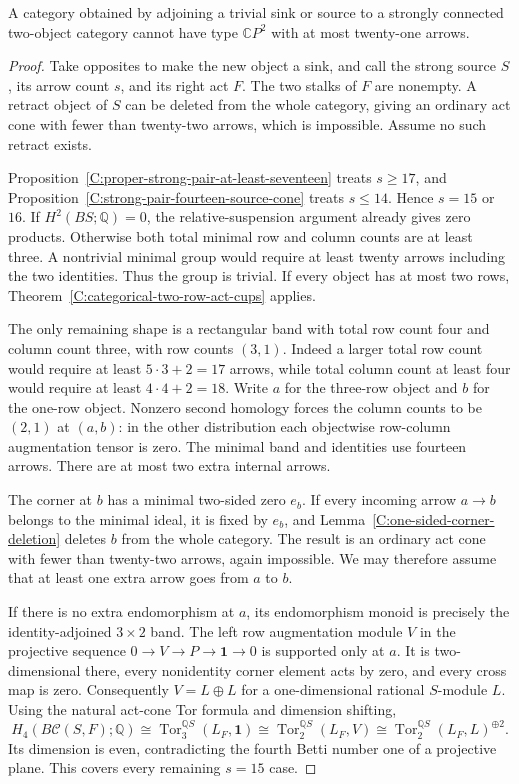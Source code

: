 \begin{theorem}\label{C:strong-pair-trivial-endpoint21}
A category obtained by adjoining a trivial sink or source to a
strongly connected two-object category cannot have type
$\mathbb CP^2$ with at most twenty-one arrows.
\end{theorem}
\begin{proof}
Take opposites to make the new object a sink, and call the strong
source $S$, its arrow count $s$, and its right act $F$. The two
stalks of $F$ are nonempty. A retract object of $S$ can be deleted
from the whole category, giving an ordinary act cone with fewer
than twenty-two arrows, which is impossible. Assume no such
retract exists.

Proposition~\ref{C:proper-strong-pair-at-least-seventeen} treats
$s\geq17$, and Proposition~\ref{C:strong-pair-fourteen-source-cone}
treats $s\leq14$. Hence $s=15$ or $16$.
If $H^2(BS;\mathbb Q)=0$, the relative-suspension argument
already gives zero products. Otherwise both total minimal row
and column counts are at least three. A nontrivial minimal group
would require at least twenty arrows including the two identities.
Thus the group is trivial. If every object has at most two rows,
Theorem~\ref{C:categorical-two-row-act-cups} applies.

The only remaining shape is a rectangular band with total row
count four and column count three, with row counts $(3,1)$.
Indeed a larger total row count would require at least
$5\cdot3+2=17$ arrows, while total column count at least four
would require at least $4\cdot4+2=18$. Write $a$ for the
three-row object and $b$ for the one-row object. Nonzero second
homology forces the column counts to be $(2,1)$ at $(a,b)$:
in the other distribution each objectwise row-column augmentation
tensor is zero. The minimal band and identities use fourteen
arrows. There are at most two extra internal arrows.

The corner at $b$ has a minimal two-sided zero $e_b$.
If every incoming arrow $a\to b$ belongs to the minimal ideal,
it is fixed by $e_b$, and
Lemma~\ref{C:one-sided-corner-deletion} deletes $b$ from the whole
category. The result is an ordinary act cone with fewer than
twenty-two arrows, again impossible.
We may therefore assume that at least one extra arrow goes
from $a$ to $b$.

If there is no extra endomorphism at $a$, its endomorphism monoid
is precisely the identity-adjoined $3\times2$ band. The left row
augmentation module $V$ in the projective sequence
$0\to V\to P\to\mathbf1\to0$ is supported only at $a$.
It is two-dimensional there, every nonidentity corner element
acts by zero, and every cross map is zero. Consequently
$V=L\oplus L$ for a one-dimensional rational $S$-module $L$.
Using the natural act-cone Tor formula and dimension shifting,
\[
 H_4(B\mathcal C(S,F);\mathbb Q)
   \cong\operatorname{Tor}^{\mathbb QS}_3(L_F,\mathbf1)
   \cong\operatorname{Tor}^{\mathbb QS}_2(L_F,V)
   \cong\operatorname{Tor}^{\mathbb QS}_2(L_F,L)^{\oplus2}.
\]
Its dimension is even, contradicting the fourth Betti number one
of a projective plane. This covers every remaining $s=15$ case.


\end{proof}
